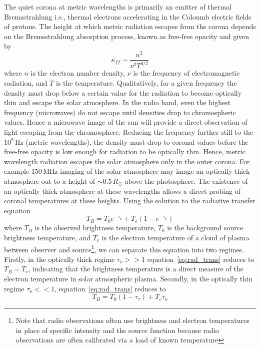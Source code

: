The quiet corona at metric wavelengths is primarily an emitter of thermal Bremsstrahlung i.e., thermal electrons accelerating in the Coloumb electric fields of protons. The height at which metric radiation escapes from the corona depends on the Bremsstrahlung absorption process, known as free-free opacity and given by
\begin{equation}
\kappa_{ff} \sim \frac{n^2}{\nu^2T^{3/2}} 
\end{equation}
where $n$ is the electron number density, $\nu$ is the frequency of electromagnetic radiation, and $T$ is the temperature. Qualitatively, for a given frequency the density must drop below a certain value for the radiation to become optically thin and escape the solar atmosphere. In the radio band, even the highest frequency (microwaves) do not escape until densities drop to chromospheric values. Hence a microwave image of the sun will provide a direct observation of light escaping from the chromosphere. Reducing the frequency further still to the $10^{8}$\,Hz (metric wavelengths), the density must drop to coronal values before the free-free opacity is low enough for radiation to be optically thin. Hence, metric wavelength radiation escapes the solar atmosphere only in the outer corona. For example 150\,MHz imaging of the solar atmosphere may image an optically thick atmosphere out to a height of $\sim$0.5$\,R_{\odot}$ above the photosphere. The existence of an optically thick atmosphere at these wavelengths allows a direct probing of coronal temperatures at these heights. Using the solution to the radiative transfer equation
\begin{equation}
T_B = T_0e^{-\tau_{\nu}} + T_e(1-e^{-\tau_{\nu}})
\label{eq:rad_trans}
\end{equation}
where $T_B$ is the observed brightness temperature, $T_0$ is the background source brightness temperature, and $T_e$ is the electron temperature of a cloud of plasma between observer and source\footnote{Note that radio observations often use brightness and electron temperatures in place of specific intensity and the source function because radio observations are often calibrated via a load of known temperature}, we can separate this equation into two regimes. Firstly,
in the optically thick regime $\tau_{\nu}>>1$ equation~\ref{eq:rad_trans} reduces to $T_B = T_e$, indicating that the brightness temperature is a direct measure of the electron temperature in solar atmospheric plasma. Secondly, in the optically thin regime $\tau_{\nu}<<1$, equation~\ref{eq:rad_trans} reduces to 
\begin{equation}
T_B = T_0(1-\tau_{\tau}) + T_e\tau_{\nu}
\end{equation}
